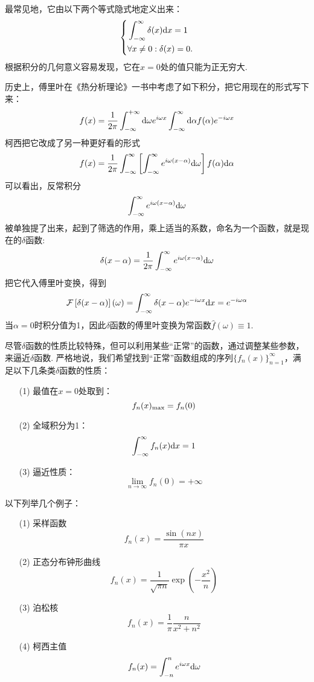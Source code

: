 \documentclass[main.tex]{subfiles}
\begin{document}
最常见地，它由以下两个等式隐式地定义出来：
\[\left\{\begin{aligned} & \int_{-\infty}^{\infty}\delta(x){\rm d}x=1 \\ & \forall x \neq 0: \delta(x)=0. \end{aligned}\right.\]
根据积分的几何意义容易发现，它在\(x=0\)处的值只能为正无穷大.

历史上，傅里叶在《热分析理论》一书中考虑了如下积分，把它用现在的形式写下来：
\[f(x) = \frac{1}{2\pi}\int_{-\infty}^{+\infty}{\rm d}\omega e^{i\omega x} \int_{-\infty}^{\infty}{\rm d}\alpha f(\alpha)e^{-i\omega x}\]
柯西把它改成了另一种更好看的形式
\[f(x) = \frac{1}{2\pi}\int_{-\infty}^{\infty}\left[\int_{-\infty}^{\infty}e^{i\omega(x-\alpha)}{\rm d}\omega\right]f(\alpha){\rm d}\alpha\]
可以看出，反常积分\[\int_{-\infty}^{\infty}e^{i\omega(x-\alpha)}{\rm d}\omega\]被单独提了出来，起到了筛选的作用，乘上适当的系数，命名为一个函数，就是现在的\(\delta\)函数:
\[\delta(x-\alpha)=\frac{1}{2\pi}\int_{-\infty}^{\infty}e^{i\omega(x-\alpha)}{\rm d}\omega\]
把它代入傅里叶变换，得到
\[\mathcal{F}\left[\delta(x-\alpha)\right](\omega) = \int_{-\infty}^{\infty}\delta(x-\alpha)e^{-i\omega x}{\rm d}x = e^{-i\omega\alpha}\]
当\(\alpha=0\)时积分值为1，因此\(\delta\)函数的傅里叶变换为常函数\(\hat{f}(\omega)\equiv 1\).

\vspace{1cm}

尽管\(\delta\)函数的性质比较特殊，但可以利用某些“正常”的函数，通过调整某些参数，来逼近\(\delta\)函数. 严格地说，我们希望找到“正常”函数组成的序列\(\{f_n(x)\}_{n=1}^{\infty}\)，满足以下几条类\(\delta\)函数的性质：
\begin{itemize}
    \item[(1)] 最值在\(x=0\)处取到：\[f_n(x)_{{\rm max}}=f_n(0)\]
    \item[(2)] 全域积分为1：\[\int_{-\infty}^{\infty}f_n(x){\rm d}x=1\] 
    \item[(3)] 逼近性质：\[\lim_{n\to\infty}f_n(0)=+\infty\] 
\end{itemize}
以下列举几个例子：
\begin{itemize}
    \item [(1)] 采样函数
    \[f_n(x)=\frac{\sin(nx)}{\pi x}\]
    \item [(2)] 正态分布钟形曲线
    \[f_n(x)=\frac{1}{\sqrt{\pi n}}\exp\left(-\frac{x^2}{n}\right)\]
    \item [(3)] 泊松核
    \[f_n(x) = \frac{1}{\pi}\frac{n}{x^2+n^2}\]
    \item [(4)] 柯西主值
    \[f_n(x) = \int_{-n}^{n}e^{i\omega x}{\rm d}\omega\]
\end{itemize}
\end{document}
